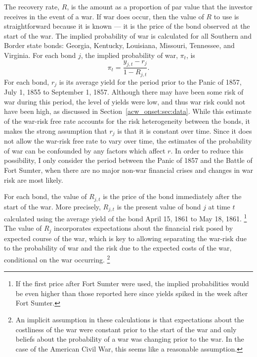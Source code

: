 The recovery rate, $R$, is the amount as a proportion of par value that the investor receives in the event of a war.
If war does occur, then the value of $R$ to use is straightforward because it is known --- it is the price of the bond observed at the start of the war.
The implied probability of war is calculated for all Southern and Border state bonds: Georgia, Kentucky, Louisiana, Missouri, Tennessee, and Virginia.
For each bond $j$, the implied probability of war, $\pi_{t}$, is
\begin{equation}
  \pi_{t} = \frac{y_{j,t} - r_{j}}{1 - R_{j,t}} \text{.}
\end{equation}
For each bond, $r_{j}$ is its average yield for the period prior to the Panic of 1857, July  1, 1855 to September  1, 1857.
Although there may have been some risk of war during this period, the level of yields were low, and thus war risk could not have been high, as discussed in Section~\ref{acw_onset:sec:data}.
While this estimate of the war-risk free rate accounts for the risk heterogeneity between the bonds, it makes the strong assumption that $r_{j}$ is that it is constant over time.
Since it does not allow the war-risk free rate to vary over time, the estimates of the probability of war can be confounded by any factors which affect $r$.
In order to reduce this possibility, I only consider the period between the Panic of 1857 and the Battle of Fort Sumter, when there are no major non-war financial crises and changes in war risk are most likely.

For each bond, the value of $R_{j,t}$ is the price of the bond immediately after the start of the war.
More precisely, $R_{j,t}$ is the present value of bond $j$ at time $t$ calculated using the average yield of the bond April 15, 1861 to May 18, 1861.%
\footnote{
  If the first price after Fort Sumter were used, the implied probabilities would be even higher than those reported here since yields spiked in the week after Fort Sumter.
}
The value of $R_{j}$ incorporates expectations about the financial risk posed by expected course of the war, which is key to allowing separating the war-risk due to the probability of war and the risk due to the expected costs of the war, conditional on the war occurring.%
\footnote{
  An implicit assumption in these calculations is that expectations about the costliness of the war were constant prior to the start of the war and only beliefs about the probability of a war was changing prior to the war.
  In the case of the American Civil War, this seems like a reasonable assumption.
}

